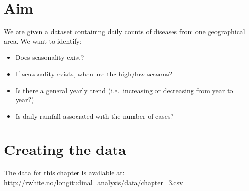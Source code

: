\documentclass[]{book}
\providecommand{\tightlist}{%
  \setlength{\itemsep}{0pt}\setlength{\parskip}{0pt}}
\begin{document}
\section{Aim}\label{aim}

We are given a dataset containing daily counts of diseases from one
geographical area. We want to identify:

\begin{itemize}
\tightlist
\item
  Does seasonality exist?
\item
  If seasonality exists, when are the high/low seasons?
\item
  Is there a general yearly trend (i.e.~increasing or decreasing from
  year to year?)
\item
  Is daily rainfall associated with the number of cases?
\end{itemize}

\newpage

\section{Creating the data}\label{creating-the-data}

The data for this chapter is available at:
\url{http://rwhite.no/longitudinal_analysis/data/chapter_3.csv}
\end{document}
